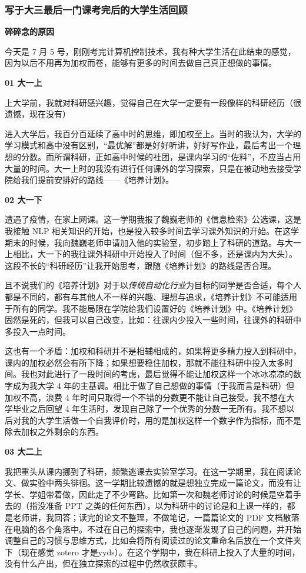 \subsubsection{写于大三最后一门课考完后的大学生活回顾}
\textbf{碎碎念的原因}

今天是 7 月 5
号，刚刚考完计算机控制技术，我有种大学生活在此结束的感觉，因为以后不用再为加权而卷，能够有更多的时间去做自己真正想做的事情。

\textbf{01 大一上}

上大学前，我就对科研感兴趣，觉得自己在大学一定要有一段像样的科研经历（很遗憾，现在没有）

进入大学后，我百分百延续了高中时的思维，即加权至上。当时的我认为，大学的学习模式和高中没有区别，``最优解''都是好好听讲，好好写作业，最后考出一个理想的分数。而所谓科研，正如高中时候的社团，是课内学习的``佐料''，不应当占用大量的时间。大一上时的我没有进行任何课外的学习探索，只是在被动地去接受学院给我们提前安排好的路线------《培养计划》。

\textbf{02 大一下}

遭遇了疫情，在家上网课。这一学期我报了魏巍老师的《信息检索》公选课，这是我接触
NLP
相关知识的开始，也是投入较多时间去学习课外知识的开始。在这学期末的时候，我向魏巍老师申请加入他的实验室，初步踏上了科研的道路。与大一上相比，大一下的我往课外科研中开始投入了时间（但不多，还是课内为大头）。这段不长的``科研经历''让我开始思考，跟随《培养计划》的路线是否合理。

且不说我们的《培养计划》对于以\emph{传统自动化行业}为目标的同学是否合适，每个人都是不同的，都有与其他人不一样的兴趣、理想与追求，《培养计划》不可能适用于所有的同学。我不能局限在学院给我们设置好的《培养计划》中。《培养计划》固然是死的，但我可以自己改变，比如：往课内少投入一些时间，往课外的科研中多投入一点时间。

这也有一个矛盾：加权和科研并不是相辅相成的，如果将更多精力投入到科研中，课内的加权必然会有所下降；如果想要稳住加权，那就不能往科研中投入太多时间。我也对此进行了一段时间的考虑，最后觉得不能让加权这样一个冰冰凉凉的数字成为我大学
4 年的主基调。相比于做了自己想做的事情（于我而言是科研）但加权不高，浪费
4 年时间只取得一个不错的分数更不能让自己接受。我不想在大学毕业之后回望 4
年生活时，发现自己除了一个优秀的分数一无所有。我不想以后对我的大学生活做一个自我评价时，用的是加权这样一个数字作为指标，而不是除去加权之外剩余的东西。

\textbf{03 大二上}

我把重头从课内挪到了科研，频繁逃课去实验室学习。在这一学期里，我在阅读论文、做实验中两头徘徊。这一学期比较遗憾的就是想独立完成一篇论文，而没有让学长、学姐带着做，因此走了不少弯路。比如第一次和魏老师讨论的时候是空着手去的（指没准备
PPT
之类的任何东西），以为科研中的讨论是和上课一样的，都是老师讲，我回答；读完的论文不整理，不做笔记，一篇篇论文的
PDF
文档散落在电脑的各个角落中。不过在自己的探索中，我也逐渐发现了自己的问题，并开始调整自己的习惯与思维方式，比如会将所有阅读过的论文重命名后放在一个文件夹下（现在感觉
zotero
才是yyds）。在这个学期中，我在科研上投入了大量的时间，没有什么产出，但在独立探索的过程中仍然收获颇丰。

